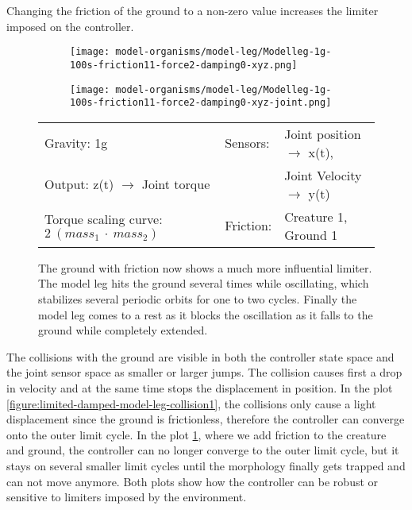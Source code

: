 \documentclass[main]{subfiles}
\begin{document}
Changing the friction of the ground to a non-zero value increases the limiter imposed on the controller.

\begin{figure}[H]
	\centering
		\begin{subfigure}[c]{0.45\textwidth}
	\texttt{[image: model-organisms/model-leg/Modelleg-1g-100s-friction11-force2-damping0-xyz.png]}
		\end{subfigure}
	\begin{subfigure}[c]{0.45\textwidth}
	\texttt{[image: model-organisms/model-leg/Modelleg-1g-100s-friction11-force2-damping0-xyz-joint.png]}
		\end{subfigure}
	\caption[Limited chaotic controller controlling model leg on ground with friction]{The ground with friction now shows a much more influential limiter. The model leg hits the ground several times while oscillating, which stabilizes several periodic orbits for one to two cycles. Finally the model leg comes to a rest as it blocks the oscillation as it falls to the ground while completely extended.}
	\begin{tabular}{l|ll}
	\hline 
	Gravity: 1g  & Sensors: & Joint position \(\rightarrow\) x(t),\\
	 Output: z(t) \(\rightarrow\) Joint torque &  & Joint Velocity \(\rightarrow\) y(t) \\
	  Torque scaling curve: \(2~(mass_1~\cdot~mass_2)\) & Friction: & Creature 1, Ground 1 \\
	  \hline
	\end{tabular}

	\label{figure:limited-damped-model-leg-collision2}
\end{figure}

The collisions with the ground are visible in both the controller state space and the joint sensor space as smaller or larger jumps. %
%
The collision causes first a drop in velocity and at the same time stops the displacement in position. %
%
In the plot \ref{figure:limited-damped-model-leg-collision1}, the collisions only cause a light displacement since the ground is frictionless, therefore the controller can converge onto the outer limit cycle. %
%
In the plot \ref{figure:limited-damped-model-leg-collision2}, where we add friction to the creature and ground, the controller can no longer converge to the outer limit cycle, but it stays on several smaller limit cycles until the morphology finally gets trapped and can not move anymore. %
%
Both plots show how the controller can be robust or sensitive to limiters imposed by the environment.
\end{document}
